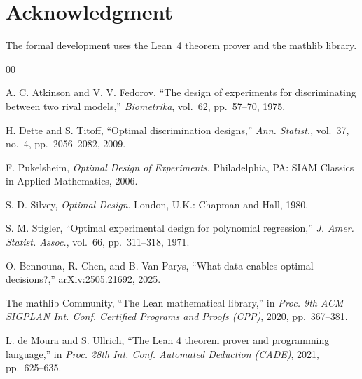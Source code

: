 \section*{Acknowledgment}

The formal development uses the Lean~4 theorem prover and the mathlib library.

\begin{thebibliography}{00}

 A. C. Atkinson and V. V. Fedorov, ``The design of experiments for
discriminating between two rival models,'' \emph{Biometrika}, vol.~62, pp.~57--70, 1975.

 H. Dette and S. Titoff, ``Optimal discrimination designs,''
\emph{Ann. Statist.}, vol.~37, no.~4, pp.~2056--2082, 2009.

 F. Pukelsheim, \emph{Optimal Design of Experiments}. Philadelphia,
PA: SIAM Classics in Applied Mathematics, 2006.

 S. D. Silvey, \emph{Optimal Design}. London, U.K.: Chapman and Hall,
1980.

 S. M. Stigler, ``Optimal experimental design for polynomial
regression,'' \emph{J. Amer. Statist. Assoc.}, vol.~66, pp.~311--318, 1971.

 O. Bennouna, R. Chen, and B. Van Parys, ``What data enables optimal
decisions?,'' arXiv:2505.21692, 2025.

 The mathlib Community, ``The Lean mathematical library,'' in
\emph{Proc. 9th ACM SIGPLAN Int. Conf. Certified Programs and Proofs (CPP)}, 2020,
pp.~367--381.

 L. de Moura and S. Ullrich, ``The Lean 4 theorem prover and
programming language,'' in \emph{Proc. 28th Int. Conf. Automated Deduction (CADE)}, 2021,
pp.~625--635.

\end{thebibliography}




